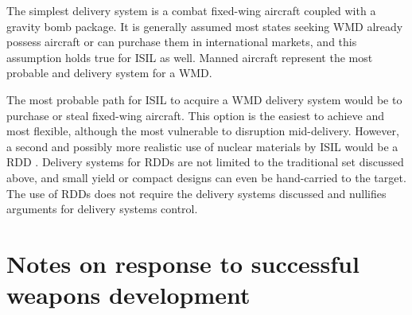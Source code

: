 \documentclass{report}
\begin{document}
The simplest delivery system is a combat fixed-wing aircraft coupled with a gravity bomb package. It is generally assumed most states seeking WMD already possess aircraft or can purchase them in international markets, and this assumption holds true for ISIL as well. Manned aircraft represent the most probable and delivery system for a WMD. 

The most probable path for ISIL to acquire a WMD delivery system would be to purchase or steal fixed-wing aircraft. This option is the easiest to achieve and most flexible, although the most vulnerable to disruption mid-delivery. However, a second and possibly more realistic use of nuclear materials by ISIL would be a RDD \cite{D.Esfandiary2014}. Delivery systems for RDDs are not limited to the traditional set discussed above, and small yield or compact designs can even be hand-carried to the target. The use of RDDs does not require the delivery systems discussed and nullifies arguments for delivery systems control. 










\chapter{Notes on response to successful weapons development}
\end{document}
